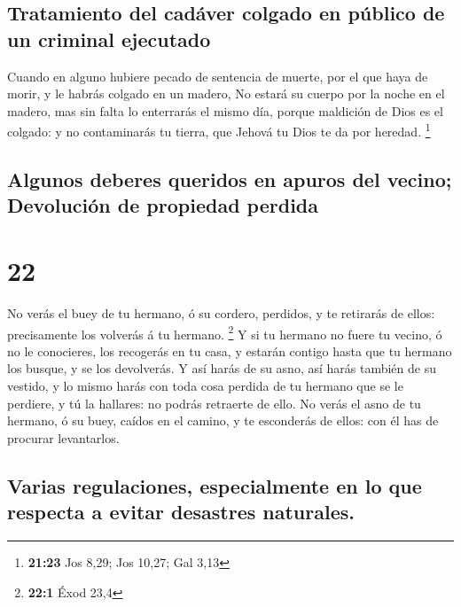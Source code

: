 \hypertarget{tratamiento-del-caduxe1ver-colgado-en-puxfablico-de-un-criminal-ejecutado}{%
\subsection{Tratamiento del cadáver colgado en público de un criminal
ejecutado}\label{tratamiento-del-caduxe1ver-colgado-en-puxfablico-de-un-criminal-ejecutado}}

 Cuando en alguno hubiere pecado de sentencia de muerte,
por el que haya de morir, y le habrás colgado en un madero,
 No estará su cuerpo por la noche en el madero, mas sin
falta lo enterrarás el mismo día, porque maldición de Dios es el
colgado: y no contaminarás tu tierra, que Jehová tu Dios te da por
heredad. \footnote{\textbf{21:23} Jos 8,29; Jos 10,27; Gal 3,13}

\hypertarget{algunos-deberes-queridos-en-apuros-del-vecino-devoluciuxf3n-de-propiedad-perdida}{%
\subsection{Algunos deberes queridos en apuros del vecino; Devolución de
propiedad
perdida}\label{algunos-deberes-queridos-en-apuros-del-vecino-devoluciuxf3n-de-propiedad-perdida}}

\hypertarget{section-21}{%
\section{22}\label{section-21}}

 No verás el buey de tu hermano, ó su cordero, perdidos, y
te retirarás de ellos: precisamente los volverás á tu hermano.
\footnote{\textbf{22:1} Éxod 23,4}  Y si tu hermano no
fuere tu vecino, ó no le conocieres, los recogerás en tu casa, y estarán
contigo hasta que tu hermano los busque, y se los devolverás.
 Y así harás de su asno, así harás también de su vestido,
y lo mismo harás con toda cosa perdida de tu hermano que se le perdiere,
y tú la hallares: no podrás retraerte de ello.  No verás
el asno de tu hermano, ó su buey, caídos en el camino, y te esconderás
de ellos: con él has de procurar levantarlos.

\hypertarget{varias-regulaciones-especialmente-en-lo-que-respecta-a-evitar-desastres-naturales.}{%
\subsection{Varias regulaciones, especialmente en lo que respecta a
evitar desastres
naturales.}\label{varias-regulaciones-especialmente-en-lo-que-respecta-a-evitar-desastres-naturales.}}

